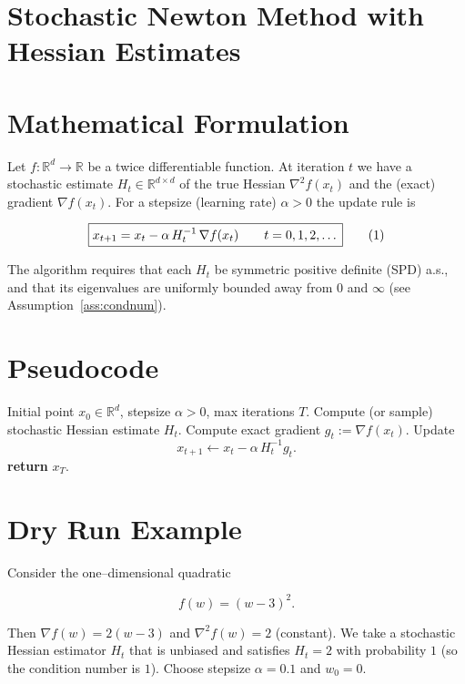 \documentclass{article}
\newcommand{\R}{\mathbb{R}}
\begin{document}
\section*{Stochastic Newton Method with Hessian Estimates}

\section*{Mathematical Formulation}
Let $f:\R^{d}\rightarrow\R$ be a twice differentiable function.  
At iteration $t$ we have a stochastic estimate $H_t\in\R^{d\times d}$ of the true Hessian $\nabla^2 f(x_t)$ and the (exact) gradient $\nabla f(x_t)$.  
For a stepsize (learning rate) $\alpha>0$ the update rule is  

\[
\boxed{%
x_{t+1}=x_t-\alpha\, H_t^{-1}\,\nabla f(x_t) \qquad t=0,1,2,\dots
}
\tag{1}
\]

The algorithm requires that each $H_t$ be symmetric positive definite (SPD) a.s., and that its eigenvalues are uniformly bounded away from $0$ and $\infty$ (see Assumption~\ref{ass:condnum}).

\section*{Pseudocode}
\begin{algorithm}[H]
\caption{Stochastic Newton with Hessian Estimates}
\begin{algorithmic}[1]
\Require Initial point $x_0\in\R^{d}$, stepsize $\alpha>0$, max iterations $T$.
    \State Compute (or sample) stochastic Hessian estimate $H_t$.
    \State Compute exact gradient $g_t:=\nabla f(x_t)$.
    \State Update 
    \[
    x_{t+1}\gets x_t-\alpha\, H_t^{-1} g_t .
    \]
\EndFor
\State \textbf{return} $x_T$.
\end{algorithmic}
\end{algorithm}

\section*{Dry Run Example}
Consider the one–dimensional quadratic  

\[
f(w)=(w-3)^2 .
\]

Then $\nabla f(w)=2(w-3)$ and $\nabla^2 f(w)=2$ (constant).  
We take a stochastic Hessian estimator $H_t$ that is unbiased and satisfies $H_t=2$ with probability $1$ (so the condition number is $1$).  
Choose stepsize $\alpha=0.1$ and $w_0=0$.
\end{document}
